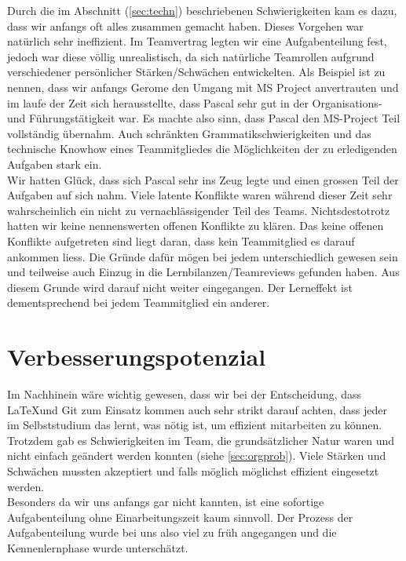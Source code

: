 Durch die im Abschnitt (\ref{sec:techn}) beschriebenen Schwierigkeiten kam es dazu, dass wir anfangs oft alles zusammen gemacht haben. Dieses Vorgehen war natürlich sehr ineffizient. Im Teamvertrag legten wir eine Aufgabenteilung fest, jedoch war diese völlig unrealistisch, da sich natürliche Teamrollen aufgrund verschiedener persönlicher Stärken/Schwächen entwickelten. Als Beispiel ist zu nennen, dass wir anfangs Gerome den Umgang mit MS Project anvertrauten und im laufe der Zeit sich herausstellte, dass Pascal sehr gut in der Organisations- und Führungstätigkeit war. Es machte also sinn, dass Pascal den MS-Project Teil vollständig übernahm. Auch schränkten Grammatikschwierigkeiten und das technische Knowhow eines Teammitgliedes die Möglichkeiten der zu erledigenden Aufgaben stark ein. \\
Wir hatten Glück, dass sich Pascal sehr ins Zeug legte und einen grossen Teil der Aufgaben auf sich nahm. Viele latente Konflikte waren während dieser Zeit sehr wahrscheinlich ein nicht zu vernachlässigender Teil des Teams. Nichtsdestotrotz hatten wir keine nennenswerten offenen Konflikte zu klären. Das keine offenen Konflikte aufgetreten sind liegt daran, dass kein Teammitglied es darauf ankommen liess. Die Gründe dafür mögen bei jedem unterschiedlich gewesen sein und teilweise auch Einzug in die Lernbilanzen/Teamreviews gefunden haben. Aus diesem Grunde wird darauf nicht weiter eingegangen. Der Lerneffekt ist dementsprechend bei jedem Teammitglied ein anderer.


\section{Verbesserungspotenzial}

Im Nachhinein wäre wichtig gewesen, dass wir bei der Entscheidung, dass \LaTeX und Git zum Einsatz kommen auch sehr strikt darauf achten, dass jeder im Selbststudium das lernt, was nötig ist, um effizient mitarbeiten zu können. \\
Trotzdem gab es Schwierigkeiten im Team, die grundsätzlicher Natur waren und nicht einfach geändert werden konnten (siehe \ref{sec:orgprob}). Viele Stärken und Schwächen mussten akzeptiert und falls möglich möglichst effizient eingesetzt werden. \\
Besonders da wir uns anfangs gar nicht kannten, ist eine sofortige Aufgabenteilung ohne Einarbeitungszeit kaum sinnvoll. Der Prozess der Aufgabenteilung wurde bei uns also viel zu früh angegangen und die Kennenlernphase wurde unterschätzt. 